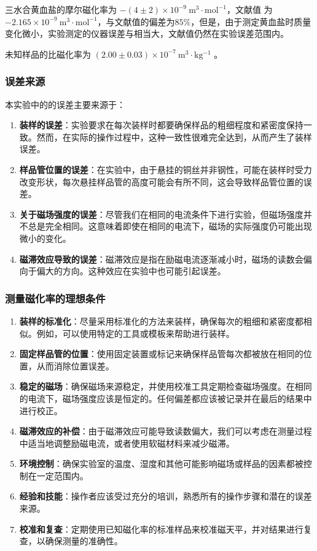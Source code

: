 \documentclass[cn,hazy,pku,12pt,normal,math=newtx,cite=super]{elegantnote}
\begin{document}
三水合黄血盐的摩尔磁化率为 $-(4\pm 2)\times 10^{-9} \mathrm{~m}^3 \cdot \mathrm{mol}^{-1}$，文献值\cite{haynes2016crc} 为 $-2.165 \times 10^{-9} \mathrm{~m}^3 \cdot \mathrm{mol}^{-1}$，与文献值的偏差为$85\%$，但是，由于测定黄血盐时质量变化微小，实验测定的仪器误差与相当大，文献值仍然在实验误差范围内。

未知样品的比磁化率为 $(2.00\pm 0.03) \times 10^{-7} \mathrm{~m^3\cdot kg^{-1}}$ 。

\subsubsection{误差来源}

本实验中的的误差主要来源于：
\begin{enumerate}
    \item \textbf{装样的误差}：实验要求在每次装样时都要确保样品的粗细程度和紧密度保持一致。然而，在实际的操作过程中，这种一致性很难完全达到，从而产生了装样误差。
    \item \textbf{样品管位置的误差}：在实验中，由于悬挂的铜丝并非钢性，可能在装样时受力改变形状，每次悬挂样品管的高度可能会有所不同，这会导致样品管位置的误差。
    \item \textbf{关于磁场强度的误差}：尽管我们在相同的电流条件下进行实验，但磁场强度并不总是完全相同。这意味着即使在相同的电流下，磁场的实际强度仍可能出现微小的变化。
    \item \textbf{磁滞效应导致的误差}：磁滞效应是指在励磁电流逐渐减小时，磁场的读数会偏向于偏大的方向。这种效应在实验中也可能引起误差。  
\end{enumerate}

\subsubsection{测量磁化率的理想条件}

\begin{enumerate}
    \item \textbf{装样的标准化}：尽量采用标准化的方法来装样，确保每次的粗细和紧密度都相似。例如，可以使用特定的工具或模板来帮助进行装样。
    \item \textbf{固定样品管的位置}：使用固定装置或标记来确保样品管每次都被放在相同的位置，从而消除位置误差。
    \item \textbf{稳定的磁场}：确保磁场来源稳定，并使用校准工具定期检查磁场强度。在相同的电流下，磁场强度应该是恒定的。任何偏差都应该被记录并在最后的结果中进行校正。
    \item \textbf{磁滞效应的补偿}：由于磁滞效应可能导致读数偏大，我们可以考虑在测量过程中适当地调整励磁电流，或者使用软磁材料来减少磁滞。
    \item \textbf{环境控制}：确保实验室的温度、湿度和其他可能影响磁场或样品的因素都被控制在一定范围内。
    \item \textbf{经验和技能}：操作者应该受过充分的培训，熟悉所有的操作步骤和潜在的误差来源。
    \item \textbf{校准和复查}：定期使用已知磁化率的标准样品来校准磁天平，并对结果进行复查，以确保测量的准确性。
\end{enumerate}
\end{document}

